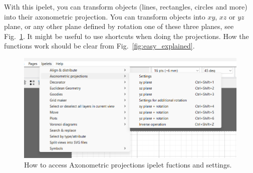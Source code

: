 \documentclass[11pt,a4paper]{article}
\begin{document}
With this ipelet, you can transform objects (lines, rectangles, circles and more) into their axonometric projection. You can transform objects into $xy$, $xz$ or $yz$ plane, or any other plane defined by rotation one of these three planes, see Fig.~\ref{fig:ipe_access_ipelet}. It might be useful to use shortcuts when doing the projections. How the functions work should be clear from Fig.~\ref{fig:easy_explained}.

\begin{figure}[bh]
\begin{center}
\includegraphics[scale=0.7]{png/main_menu.png}
\caption{How to access Axonometric projections ipelet fuctions and settings.}
\label{fig:ipe_access_ipelet}
\end{center}
\end{figure}
\end{document}
